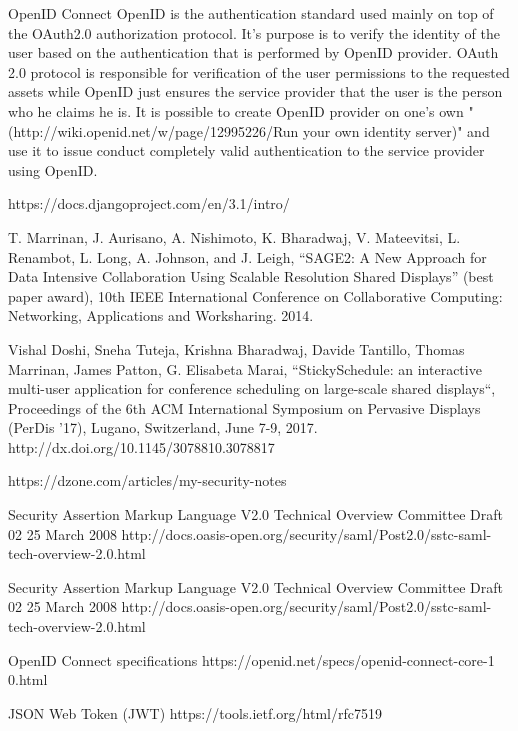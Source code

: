 \documentclass[magisterska,en]{pracamgr}
\begin{document}
OpenID Connect
OpenID is the authentication standard used mainly on top of the OAuth2.0 authorization protocol. It's purpose is to verify the identity of the user based on the authentication that is performed by OpenID provider. OAuth 2.0 protocol is responsible for verification of the user permissions to the requested assets while OpenID just ensures the service provider that the user is the person who he claims he is. It is possible to create OpenID provider on one's own "(http://wiki.openid.net/w/page/12995226/Run your own identity server)" and use it to issue conduct completely valid authentication to the service provider using OpenID.

\begin{thebibliography}{9}

  https://docs.djangoproject.com/en/3.1/intro/
  
  T. Marrinan, J. Aurisano, A. Nishimoto, K. Bharadwaj, V. Mateevitsi, L. Renambot, L. Long, A. Johnson, and J. Leigh, “SAGE2: A New Approach for Data Intensive Collaboration Using Scalable Resolution Shared Displays” (best paper award), 10th IEEE International Conference on Collaborative Computing: Networking, Applications and Worksharing. 2014.
  
  Vishal Doshi, Sneha Tuteja, Krishna Bharadwaj, Davide Tantillo, Thomas Marrinan, James Patton, G. Elisabeta Marai, “StickySchedule: an interactive multi-user application for conference scheduling on large-scale shared displays“, Proceedings of the 6th ACM International Symposium on Pervasive Displays (PerDis ’17), Lugano, Switzerland, June 7-9, 2017. http://dx.doi.org/10.1145/3078810.3078817
  
  
  https://dzone.com/articles/my-security-notes
  
 Security Assertion Markup Language V2.0 Technical Overview
 Committee Draft 02
 25 March 2008
 http://docs.oasis-open.org/security/saml/Post2.0/sstc-saml-tech-overview-2.0.html
 
 Security Assertion Markup Language V2.0 Technical Overview
 Committee Draft 02
 25 March 2008
 http://docs.oasis-open.org/security/saml/Post2.0/sstc-saml-tech-overview-2.0.html
 
 
 OpenID Connect specifications
 https://openid.net/specs/openid-connect-core-1 0.html
 
 JSON Web Token (JWT)
 https://tools.ietf.org/html/rfc7519
 
\end{thebibliography}
\end{document}
